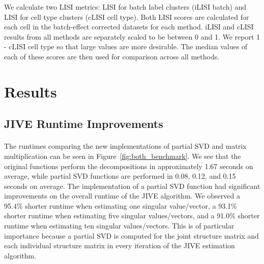 \documentclass[
12pt, %
letterpaper, %
oneside, %
headinclude,footinclude, %
BCOR5mm, %
]{scrartcl}
\begin{document}
We calculate two LISI metrics: LISI for batch label clusters (iLISI batch) and LISI for cell type clusters (cLISI cell type). Both LISI scores are calculated for each cell in the batch-effect corrected datasets for each method. iLISI and cLISI results from all methods are separately scaled to be between 0 and 1. We report 1 - cLISI cell type so that large values are more desirable. The median values of each of these scores are then used for comparison across all methods.


\section{Results}

\subsection{JIVE Runtime Improvements}

\paragraph*{}
The runtimes comparing the new implementations of partial SVD and matrix multiplication can be seen in Figure~\ref{fig:both_benchmark}. We see that the original functions perform the decompositions in approximately 1.67 seconds on average, while partial SVD functions are performed in 0.08, 0.12, and 0.15 seconds on average. The implementation of a partial SVD function had significant improvements on the overall runtime of the JIVE algorithm. We observed a 95.4\% shorter runtime when estimating one singular value/vector, a 93.1\% shorter runtime when estimating five singular values/vectors, and a 91.0\% shorter runtime when estimating ten singular values/vectors. This is of particular importance because a partial SVD is computed for the joint structure matrix and each individual structure matrix in every iteration of the JIVE estimation algorithm.
\end{document}
